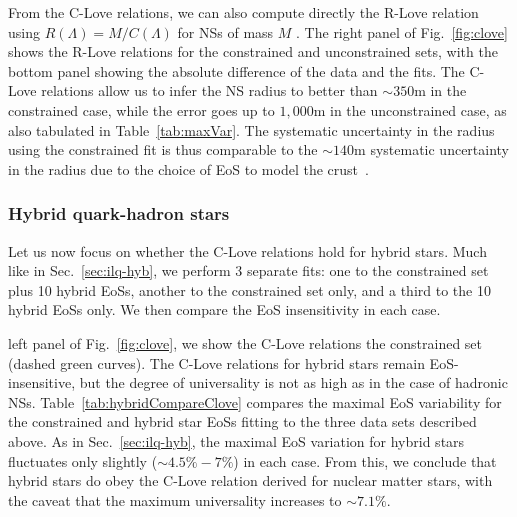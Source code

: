 \documentclass[prd,twocolumn,nofootinbib,superscriptaddress,amsmath,amssymb]{revtex4-1}
\begin{document}
From the C-Love relations, we can also compute directly the R-Love relation using $R(\Lambda)=M/C(\Lambda)$ for NSs of mass $M$ . The right panel of Fig.~\ref{fig:clove} shows the R-Love relations for the constrained and unconstrained sets, with the bottom panel showing the absolute difference of the data and the fits. The C-Love relations allow us to infer the NS radius to better than $\sim 350 \textrm{m} $ in the constrained case, while the error goes up to $1,000 \textrm{m}$ in the unconstrained case, as also tabulated in Table~\ref{tab:maxVar}. The systematic uncertainty in the radius using the constrained fit is thus comparable to the $\sim 140\textrm{m}$ systematic uncertainty in the radius due to the choice of EoS to model the crust~\cite{Gamba:2019kwu}. 


\subsubsection{Hybrid quark-hadron stars}
\label{sec:clove-hyb}

Let us now focus on whether the C-Love relations hold for hybrid stars. Much like in Sec.~\ref{sec:ilq-hyb}, we perform 3 separate fits: one to the constrained set plus 10 hybrid EoSs, another to the constrained set only, and a third to the 10 hybrid EoSs only. We then compare the EoS insensitivity in each case.

 left panel of Fig.~\ref{fig:clove}, we show the C-Love relations  the constrained set (dashed green curves). The C-Love relations for hybrid stars remain EoS-insensitive, but the degree of universality is not as high as in the case of hadronic NSs. Table~\ref{tab:hybridCompareClove} compares the maximal EoS variability for the constrained and hybrid star EoSs fitting to the three data sets described above. As in Sec.~\ref{sec:ilq-hyb}, the maximal EoS variation for hybrid stars fluctuates only slightly ($\sim 4.5\% - 7\%$) in each case. From this, we conclude that hybrid stars do obey the C-Love relation derived for nuclear matter stars, with the caveat that the maximum universality increases to $\sim 7.1\%$.

\end{document}
